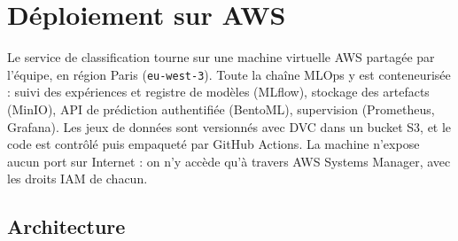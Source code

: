 
\section{Déploiement sur AWS}
\label{sec:deploiement-aws}

Le service de classification tourne sur une machine virtuelle AWS partagée par
l'équipe, en région Paris (\texttt{eu-west-3}). Toute la chaîne MLOps y est
conteneurisée : suivi des expériences et registre de modèles (MLflow), stockage
des artefacts (MinIO), API de prédiction authentifiée (BentoML), supervision
(Prometheus, Grafana). Les jeux de données sont versionnés avec DVC dans un bucket
S3, et le code est contrôlé puis empaqueté par GitHub Actions. La machine n'expose
aucun port sur Internet : on n'y accède qu'à travers AWS Systems Manager, avec les
droits IAM de chacun.

\subsection{Architecture}

